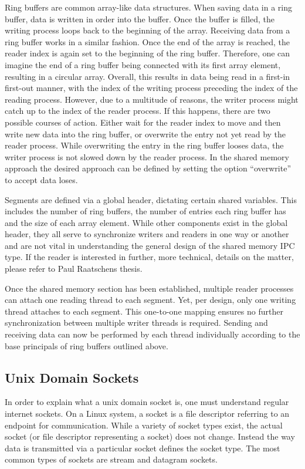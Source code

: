 Ring buffers are common array-like data structures.
When saving data in a ring buffer, data is written in order into the buffer.
Once the buffer is filled, the writing process loops back to the beginning of the array.
Receiving data from a ring buffer works in a similar fashion.
Once the end of the array is reached, the reader index is again set to the beginning of the ring buffer.
Therefore, one can imagine the end of a ring buffer being connected with its first array element, resulting in a circular array.
Overall, this results in data being read in a first-in first-out manner, with the index of the writing process preceding the index of the reading process.
However, due to a multitude of reasons, the writer process might catch up to the index of the reader process.
If this happens, there are two possible courses of action.
Either wait for the reader index to move and then write new data into the ring buffer, or overwrite the entry not yet read by the reader process.
While overwriting the entry in the ring buffer looses data, the writer process is not slowed down by the reader process.
In the shared memory approach the desired approach can be defined by setting the option ``overwrite'' to accept data loses\cite{raatschen:ipc}.

Segments are defined via a global header, dictating certain shared variables.
This includes the number of ring buffers, the number of entries each ring buffer has and the size of each array element.
While other components exist in the global header, they all serve to synchronize writers and readers in one way or another and are not vital in understanding the general design of the shared memory \ac{IPC} type.
If the reader is interested in further, more technical, details on the matter, please refer to Paul Raatschens thesis\cite{raatschen:ipc}.

Once the shared memory section has been established, multiple reader processes can attach one reading thread to each segment.
Yet, per design, only one writing thread attaches to each segment.
This one-to-one mapping ensures no further synchronization between multiple writer threads is required.
Sending and receiving data can now be performed by each thread individually according to the base principals of ring buffers outlined above.

\subsection{Unix Domain Sockets}
\label{cha:UnixDomainSockets}
In order to explain what a unix domain socket is, one must understand regular internet sockets.
On a Linux system, a socket is a file descriptor referring to an endpoint for communication\cite{man:sockets}.
While a variety of socket types exist, the actual socket (or file descriptor representing a socket) does not change.
Instead the way data is transmitted via a particular socket defines the socket type.
The most common types of sockets are stream and datagram sockets.

